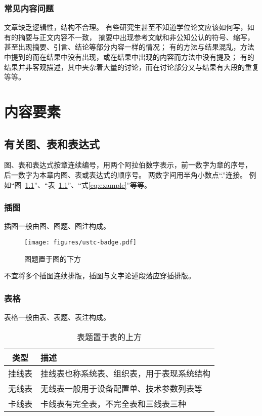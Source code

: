 \subsection{常见内容问题}

文章缺乏逻辑性，结构不合理。
有些研究生甚至不知道学位论文应该如何写，如有的摘要与正文内容不一致，
摘要中出现参考文献和非公知公认的符号、缩写，甚至出现摘要、引言、结论等部分内容一样的情况；
有的方法与结果混乱，方法中提到的而在结果中没有出现，或在结果中出现的内容而方法中没有提及；
有的结果并非客观描述，其中夹杂着大量的讨论，而在讨论部分又与结果有大段的重复等等。


\chapter{内容要素}

\section{有关图、表和表达式}

图、表和表达式按章连续编号，用两个阿拉伯数字表示，前一数字为章的序号，
后一数字为本章内图、表或表达式的顺序号。
两数字间用半角小数点“.”连接。
例如“图~\ref{fig:example}”、“表~\ref{tab:example}”、“式\eqref{eq:example}”等等。

\subsection{插图}

插图一般由图、图题、图注构成。

\begin{figure}[h]
  \centering
  \texttt{[image: figures/ustc-badge.pdf]}
  \caption{图题置于图的下方}
  \label{fig:example}
\end{figure}

不宜将多个插图连续排版，插图与文字论述段落应穿插排版。

\subsection{表格}

表格一般由表、表题、表注构成。

\begin{table}[h]
  \centering
  \caption{表题置于表的上方}
  \label{tab:example}
  \begin{tabular}{cl}
    \toprule
    类型   & 描述                                       \\
    \midrule
    挂线表 & 挂线表也称系统表、组织表，用于表现系统结构 \\
    无线表 & 无线表一般用于设备配置单、技术参数列表等   \\
    卡线表 & 卡线表有完全表，不完全表和三线表三种       \\
    \bottomrule
  \end{tabular}
\end{table}

